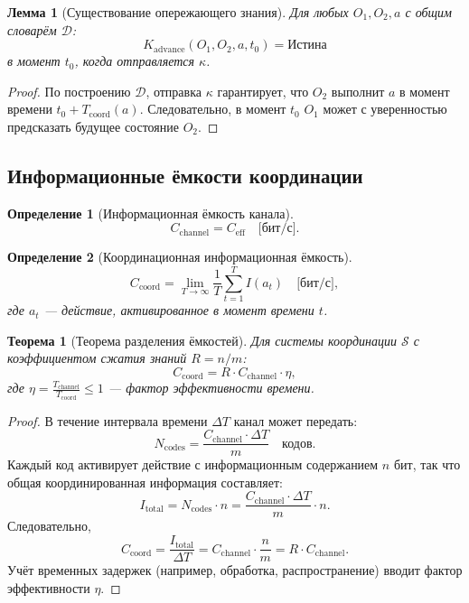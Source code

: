 \documentclass[12pt]{article}
\newtheorem{definition}{Определение}
\newtheorem{theorem}{Теорема}
\newtheorem{lemma}{Лемма}
\begin{document}
	\begin{lemma}[Существование опережающего знания]
		\label{lem:advance-knowledge}
		Для любых $O_1, O_2, a$ с общим словарём $\mathcal{D}$:
		\[
		K_{\text{advance}}(O_1, O_2, a, t_0) = \text{Истина}
		\]
		в момент $t_0$, когда отправляется $\kappa$.
	\end{lemma}
	
	\begin{proof}
		По построению $\mathcal{D}$, отправка $\kappa$ гарантирует, что $O_2$ выполнит $a$ в момент времени $t_0 + T_{\text{coord}}(a)$. Следовательно, в момент $t_0$ $O_1$ может с уверенностью предсказать будущее состояние $O_2$.
	\end{proof}
	
	\subsection{Информационные ёмкости координации}
	\label{app:capacities}
	
	\begin{definition}[Информационная ёмкость канала]
		\[
		C_{\text{channel}} = C_{\text{eff}} \quad \text{[бит/с]}.
		\]
	\end{definition}
	
	\begin{definition}[Координационная информационная ёмкость]
		\[
		C_{\text{coord}} = \lim_{T \to \infty} \frac{1}{T} \sum_{t=1}^{T} I(a_t) \quad \text{[бит/с]},
		\]
		где $a_t$ — действие, активированное в момент времени $t$.
	\end{definition}
	
	\begin{theorem}[Теорема разделения ёмкостей]
		\label{thm:capacity-separation}
		Для системы координации $\mathcal{S}$ с коэффициентом сжатия знаний $R = n/m$:
		\[
		C_{\text{coord}} = R \cdot C_{\text{channel}} \cdot \eta,
		\]
		где $\eta = \frac{T_{\text{channel}}}{T_{\text{coord}}} \leq 1$ — фактор эффективности времени.
	\end{theorem}
	
	\begin{proof}
		В течение интервала времени $\Delta T$ канал может передать:
		\[
		N_{\text{codes}} = \frac{C_{\text{channel}} \cdot \Delta T}{m} \quad \text{кодов}.
		\]
		Каждый код активирует действие с информационным содержанием $n$ бит, так что общая координированная информация составляет:
		\[
		I_{\text{total}} = N_{\text{codes}} \cdot n = \frac{C_{\text{channel}} \cdot \Delta T}{m} \cdot n.
		\]
		Следовательно,
		\[
		C_{\text{coord}} = \frac{I_{\text{total}}}{\Delta T} = C_{\text{channel}} \cdot \frac{n}{m} = R \cdot C_{\text{channel}}.
		\]
		Учёт временных задержек (например, обработка, распространение) вводит фактор эффективности $\eta$.
	\end{proof}
	
\end{document}

